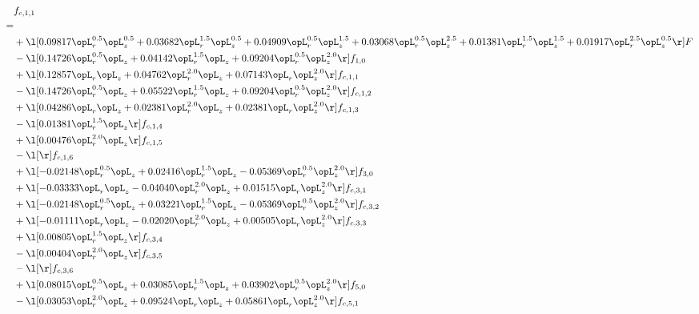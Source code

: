 \begin{alignat}{2} 
\label{eq:f_11_1} 
& f_{c,1,1} \nonumber \\ 
 = \\ 
& + \l[  0.09817 \opL_r^{0.5} \opL_z^{0.5} +  0.03682 \opL_r^{1.5} \opL_z^{0.5} +  0.04909 \opL_r^{0.5} \opL_z^{1.5} +  0.03068 \opL_r^{0.5} \opL_z^{2.5} +  0.01381 \opL_r^{1.5} \opL_z^{1.5} +  0.01917 \opL_r^{2.5} \opL_z^{0.5}  \r] F \nonumber \\ 
& - \l[  0.14726 \opL_r^{0.5} \opL_z +  0.04142 \opL_r^{1.5} \opL_z +  0.09204 \opL_r^{0.5} \opL_z^{2.0}  \r] f_{1,0} \nonumber \\ 
& + \l[  0.12857 \opL_r \opL_z +  0.04762 \opL_r^{2.0} \opL_z +  0.07143 \opL_r \opL_z^{2.0}  \r] f_{c,1,1} \nonumber \\ 
& - \l[  0.14726 \opL_r^{0.5} \opL_z +  0.05522 \opL_r^{1.5} \opL_z +  0.09204 \opL_r^{0.5} \opL_z^{2.0}  \r] f_{c,1,2} \nonumber \\ 
& + \l[  0.04286 \opL_r \opL_z +  0.02381 \opL_r^{2.0} \opL_z +  0.02381 \opL_r \opL_z^{2.0}  \r] f_{c,1,3} \nonumber \\ 
& - \l[  0.01381 \opL_r^{1.5} \opL_z  \r] f_{c,1,4} \nonumber \\ 
& + \l[  0.00476 \opL_r^{2.0} \opL_z  \r] f_{c,1,5} \nonumber \\ 
& - \l[  \r] f_{c,1,6} \nonumber \\ 
& + \l[  -0.02148 \opL_r^{0.5} \opL_z +  0.02416 \opL_r^{1.5} \opL_z   -0.05369 \opL_r^{0.5} \opL_z^{2.0}  \r] f_{3,0} \nonumber \\ 
& + \l[  -0.03333 \opL_r \opL_z   -0.04040 \opL_r^{2.0} \opL_z +  0.01515 \opL_r \opL_z^{2.0}  \r] f_{c,3,1} \nonumber \\ 
& + \l[  -0.02148 \opL_r^{0.5} \opL_z +  0.03221 \opL_r^{1.5} \opL_z   -0.05369 \opL_r^{0.5} \opL_z^{2.0}  \r] f_{c,3,2} \nonumber \\ 
& + \l[  -0.01111 \opL_r \opL_z   -0.02020 \opL_r^{2.0} \opL_z +  0.00505 \opL_r \opL_z^{2.0}  \r] f_{c,3,3} \nonumber \\ 
& + \l[  0.00805 \opL_r^{1.5} \opL_z  \r] f_{c,3,4} \nonumber \\ 
& - \l[  0.00404 \opL_r^{2.0} \opL_z  \r] f_{c,3,5} \nonumber \\ 
& - \l[  \r] f_{c,3,6} \nonumber \\ 
& + \l[  0.08015 \opL_r^{0.5} \opL_z +  0.03085 \opL_r^{1.5} \opL_z +  0.03902 \opL_r^{0.5} \opL_z^{2.0}  \r] f_{5,0} \nonumber \\ 
& - \l[  0.03053 \opL_r^{2.0} \opL_z +  0.09524 \opL_r \opL_z +  0.05861 \opL_r \opL_z^{2.0}  \r] f_{c,5,1} \nonumber \\ 

\end{alignat}
